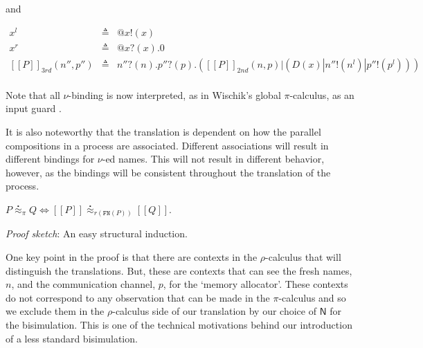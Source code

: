 \documentclass{llncs}
\makeatletter
\newcommand{\pic}{$\pi$-calculus}
\newcommand{\ldb}{[\![}
\newcommand{\rdb}{]\!]}
\newcommand{\wbbisim}{\stackrel{\centerdot}{\approx}} %
\newcommand{\pzero}{\mathbin{0}}
\newcommand{\binpar}[2]{#1 | #2}
\newcommand{\outputp}[2]{#1!(#2)}
\newcommand{\prefix}[3]{#1?(#2) . #3}
\newcommand{\quotep}[1]{\mathsf{@}#1}
\newcommand{\meaningof}[1]{\ldb #1 \rdb}
\newcommand{\rhoc}{$\rho$-calculus}
\makeatother
\begin{document}
and

\begin{eqnarray*}
	x^{l} & \triangleq & \quotep{\outputp{x}{x}} \\
	x^{r} & \triangleq & \quotep{\prefix{x}{x}{\pzero}} \\
	\meaningof{P}_{3rd}( n'', p'' ) 
		& \triangleq & 
			\prefix{n''}{n}{\prefix{p''}{p}{(\binpar{\meaningof{P}_{2nd}(  n, p )}
							        {(\binpar{D(x)}{\binpar{\outputp{n''}{n^{l}}}{\outputp{p''}{p^{l}}}})})}} \\
\end{eqnarray*}

\begin{remark}
	Note that all $\nu$-binding is now interpreted, as in Wischik's
	global $\pi$-calculus, as an input guard \cite{globalpi}.
\end{remark}
	
\begin{remark}
	It is also noteworthy that the translation is dependent on how
	the parallel compositions in a process are
	associated. Different associations will result in different
	bindings for $\nu$-ed names. This will not result in different
	behavior, however, as the bindings will be consistent
	throughout the translation of the process.
\end{remark}

\begin{theorem}[Correctness]	
	$P \wbbisim_{\pi} Q \iff \ldb P \rdb \wbbisim_{r(\texttt{FN}(P))} \ldb Q \rdb$.
\end{theorem}

\emph{Proof sketch}: An easy structural induction.

One key point in the proof is that there are contexts in the {\rhoc}
that will distinguish the translations. But, these are contexts that
can see the fresh names, $n$, and the communication channel, $p$, for
the `memory allocator'. These contexts do not correspond to any
observation that can be made in the {\pic} and so we exclude them in
the {\rhoc} side of our translation by our choice of ${\mathsf N}$
for the bisimulation. This is one of the technical motivations behind
our introduction of a less standard bisimulation.
\end{document}
